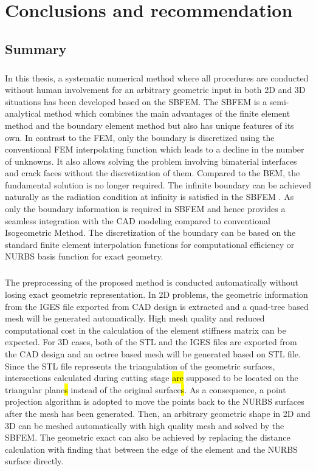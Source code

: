 
\chapter{Conclusions and recommendation}
\section{Summary}
\paragraph{}
In this thesis, a systematic numerical method where all procedures are conducted without human involvement for an arbitrary geometric input in both 2D and 3D situations has been developed based on the SBFEM.
The SBFEM is a semi-analytical method which combines the main advantages of the finite element method and the boundary element method but also has unique features of its own.
In contrast to the FEM, only the boundary is discretized using the conventional FEM interpolating function which leads to a decline in the number of unknowns.
It also allows solving the problem involving bimaterial interfaces and crack faces without the discretization of them.
Compared to the BEM, the fundamental solution is no longer required.
The infinite boundary can be achieved naturally as the radiation condition at infinity is satisfied in the SBFEM .
As only the boundary information is required in SBFEM and hence provides a seamless integration with the CAD modeling compared to conventional Isogeometric Method.
The discretization of the boundary can be based on the standard finite element interpolation functions for computational efficiency or NURBS basis function for exact geometry.

\paragraph{}
The preprocessing of the proposed method is conducted automatically without losing exact geometric representation.
In 2D problems, the geometric information from the IGES file exported from CAD design is extracted and a quad-tree based mesh will be generated automatically.
High mesh quality and reduced computational cost in the calculation of the element stiffness matrix can be expected. 
For 3D cases, both of the STL and the IGES files are exported from the CAD design and an octree based mesh will be generated based on STL file.
Since the STL file represents the triangulation of the geometric surfaces, intersections calculated during cutting stage \hl{are} supposed to be located on the triangular plane\hl{s} instead of the original surface\hl{s}.
As a consequence, a point projection algorithm is adopted to move the points back to the NURBS surfaces after the mesh has been generated.
Then, an arbitrary geometric shape in 2D and 3D can be meshed automatically with high quality mesh and solved by the SBFEM.
The geometric exact can also be achieved by replacing the distance calculation with finding that between the edge of the element and the NURBS surface directly. 

